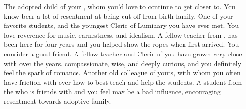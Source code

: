 \documentclass[char]{GL2020}
\begin{document}
\begin{contacts}
    \contact{\cAdopted{}} The adopted child of your \cAdoptedParentOne{\nibling}, whom you'd love to continue to get closer to. You know \cAdopted{\they} bear a lot of resentment at being cut off from \cAdopted{\their} birth family.
    \contact{\cDisney{}} One of your favorite students, and the youngest Cleric of Luminary you have ever met. You love \cDisney{\their} reverence for music, earnestness, and idealism.
    \contact{\cInterpol{}} A fellow teacher from \pFarm{}, \cInterpol{} has been here for four years and you helped show \cInterpol{\them} the ropes when \cInterpol{\they} first arrived. You consider \cInterpol{\them} a good friend.
    \contact{\cFlowPriest{}} A fellow teacher and Cleric of \cFlow{} you have grown very close with over the years. \cFlowPriest{\Theyare} compassionate, wise, and deeply curious, and you definitely feel the spark of romance.
    \contact{\cEthics{}} Another old colleague of yours, with whom you often have friction with over how to best teach and help the students.
    \contact{\cLibAssist{}} A student from the \pFarm{} who is friends with \cAdopted{} and you feel may be a bad influence, encouraging \cAdopted{\their} resentment towards \cAdopted{\their} adoptive family.
\end{contacts}
\end{document}
